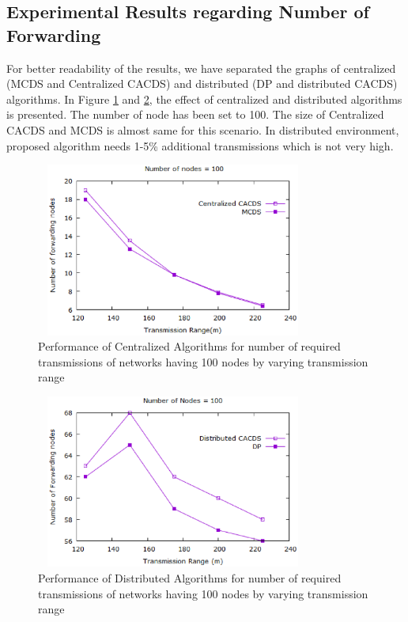 \subsection{Experimental Results regarding Number of Forwarding}
For better readability of the results, we have separated the graphs of centralized (MCDS and Centralized CACDS) and distributed (DP and distributed CACDS) algorithms. In Figure \ref{outf100c} and \ref{outf100d}, the effect of centralized and distributed algorithms is presented. The number of node has been set to 100. The size of Centralized CACDS and MCDS is almost same for this scenario. In distributed environment, proposed algorithm needs 1-5\% additional transmissions which is not very high. 
 \begin{figure}[h]
    \centering
    \includegraphics[width=90mm, height=57mm]{Figures/outf100c.eps}
    \caption{Performance of Centralized Algorithms for number of required transmissions of networks having 100 nodes by varying transmission range}
    \label{outf100c}
    \end{figure}
    
    \begin{figure}[h]
    \centering
    \includegraphics[width=90mm, height=57mm]{Figures/outf100d.eps}
    \caption{Performance of Distributed Algorithms for number of required transmissions of networks having 100 nodes by varying transmission range}
    \label{outf100d}
\end{figure}

